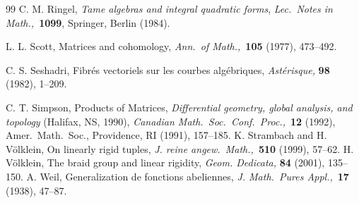 \documentclass{amsart}
\theoremstyle{plain}
\theoremstyle{definition}
\theoremstyle{remark}
\newcommand{\smalltextsc}[1]{#1}
\begin{document}
\begin{thebibliography}{99}
C. M. \smalltextsc{Ringel},
\textit{Tame algebras and integral quadratic forms},
\textit{Lec.\ Notes in Math.,}\ \textbf{1099}, Springer, Berlin (1984).

L. L. \smalltextsc{Scott},
Matrices and cohomology,
\textit{Ann.\ of Math.,}\ \textbf{105} (1977), 473--492.

C. S. \smalltextsc{Seshadri},
Fibr\'es vectoriels sur les courbes alg\'ebriques,
\textit{Ast\'erisque,} \textbf{98} (1982), 1--209.

C. T. \smalltextsc{Simpson},
Products of Matrices,
\textit{Differential geometry, global analysis, and topology} (Halifax, NS, 1990),
\textit{Canadian Math.\ Soc.\ Conf.\ Proc.,}\ \textbf{12} (1992),
Amer.\ Math.\ Soc., Providence, RI (1991),
157--185.
%
K. \smalltextsc{Strambach} and H. \smalltextsc{V\"olklein},
On linearly rigid tuples,
\textit{J. reine angew.\ Math.,}\ \textbf{510} (1999), 57--62.
%
H. \smalltextsc{V\"olklein},
The braid group and linear rigidity,
\textit{Geom. Dedicata,} \textbf{84} (2001), 135--150.
%
A. \smalltextsc{Weil},
Generalization de fonctions abeliennes,
\textit{J. Math.\ Pures Appl.,}\ \textbf{17} (1938), 47--87.

\end{thebibliography}
\end{document}
